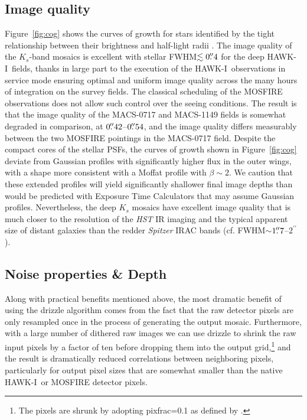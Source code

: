 \documentclass[preprint2]{aastex6}
\gdef\HAWKI{\mbox{HAWK-I}}
\begin{document}
\subsection{Image quality}
\label{s:fwhm}

Figure~\ref{fig:cog} shows the curves of growth for stars identified by the tight relationship between their brightness and half-light radii \citep[see, e.g., Fig.~13 of][]{skelton:14}.  The image quality of the $K_s$-band mosaics is excellent with stellar FWHM$\lesssim0\mbox{$.\!\!^{\prime\prime}$}4$ for the deep \HAWKI\ fields, thanks in large part to the execution of the \HAWKI\ observations in service mode ensuring optimal and uniform image quality across the many hours of integration on the survey fields.  The classical scheduling of the MOSFIRE observations does not allow such control over the seeing conditions.  The result is that the image quality of the MACS-0717 and MACS-1149 fields is somewhat degraded in comparison, at $0\mbox{$.\!\!^{\prime\prime}$}42$--$0\mbox{$.\!\!^{\prime\prime}$}54$, and the image quality differs measurably between the two MOSFIRE pointings in the MACS-0717 field.  Despite the compact cores of the stellar PSFs, the curves of growth shown in Figure~\ref{fig:cog} deviate from Gaussian profiles with significantly higher flux in the outer wings, with a shape more consistent with a Moffat profile \citep{trujillo:01}  with $\beta\sim2$.  We caution that these extended profiles will yield significantly shallower final image depths than would be predicted with Exposure Time Calculators that may assume Gaussian profiles.  Nevertheless, the deep $K_s$ mosaics have excellent image quality that is much closer to the resolution of the \textit{HST} IR imaging and the typical apparent size of distant galaxies \citep[median $r_e\sim0\farcs1$--$0\farcs2$ at $z>4$;][]{shibuya:15} than the redder \textit{Spitzer} IRAC bands (cf. FWHM$\sim$$1\mbox{$.\!\!^{\prime\prime}$}7$--$2^{\prime\prime}$).

\subsection{Noise properties \& Depth}
\label{s:depth}

Along with practical benefits mentioned above, the most dramatic benefit of using the drizzle algorithm comes from the fact that the raw detector pixels are only resampled once in the process of generating the output mosaic.  Furthermore, with a large number of dithered raw images we can use drizzle to shrink the raw input pixels by a factor of ten before dropping them into the output grid,\footnote{The pixels are shrunk by adopting pixfrac=0.1 as defined by \cite{fruchter:02}.} and the result is dramatically reduced correlations between neighboring pixels, particularly for output pixel sizes that are somewhat smaller than the native \HAWKI\ or MOSFIRE detector pixels.
\end{document}
